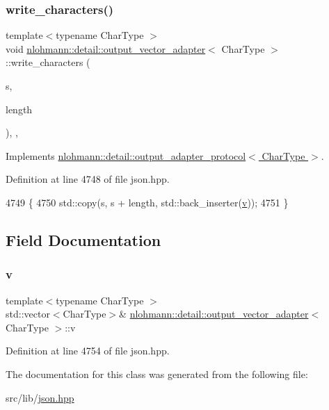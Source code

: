 \subsubsection{\texorpdfstring{write\+\_\+characters()}{write\_characters()}}
{\footnotesize\ttfamily template$<$typename Char\+Type $>$ \\
void \hyperlink{classnlohmann_1_1detail_1_1output__vector__adapter}{nlohmann\+::detail\+::output\+\_\+vector\+\_\+adapter}$<$ Char\+Type $>$\+::write\+\_\+characters (\begin{DoxyParamCaption}\item[{const Char\+Type $\ast$}]{s,  }\item[{std\+::size\+\_\+t}]{length }\end{DoxyParamCaption})\hspace{0.3cm}{\ttfamily [inline]}, {\ttfamily [override]}, {\ttfamily [virtual]}}



Implements \hyperlink{structnlohmann_1_1detail_1_1output__adapter__protocol_a2f410a164e0eda17cf6561114b0eee4a}{nlohmann\+::detail\+::output\+\_\+adapter\+\_\+protocol$<$ Char\+Type $>$}.



Definition at line 4748 of file json.\+hpp.


\begin{DoxyCode}
4749     \{
4750         std::copy(s, s + length, std::back\_inserter(\hyperlink{classnlohmann_1_1detail_1_1output__vector__adapter_a9b1ed9fba14e671ae1abb6692560ef3f}{v}));
4751     \}
\end{DoxyCode}


\subsection{Field Documentation}
\mbox{\label{classnlohmann_1_1detail_1_1output__vector__adapter_a9b1ed9fba14e671ae1abb6692560ef3f}} 
\subsubsection{\texorpdfstring{v}{v}}
{\footnotesize\ttfamily template$<$typename Char\+Type $>$ \\
std\+::vector$<$Char\+Type$>$\& \hyperlink{classnlohmann_1_1detail_1_1output__vector__adapter}{nlohmann\+::detail\+::output\+\_\+vector\+\_\+adapter}$<$ Char\+Type $>$\+::v\hspace{0.3cm}{\ttfamily [private]}}



Definition at line 4754 of file json.\+hpp.



The documentation for this class was generated from the following file\+:\begin{DoxyCompactItemize}
\item 
src/lib/\hyperlink{json_8hpp}{json.\+hpp}\end{DoxyCompactItemize}
